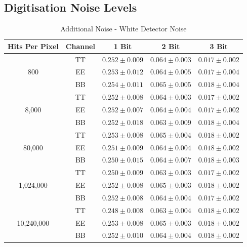 \documentclass[apj]{emulateapj}
\begin{document}
\subsection{Digitisation Noise Levels}
\label{subsec:appendixnoisetables}

\def\arraystretch{1.3}
\begin{table}[tbh]
\begin{center}
\caption{\label{tab:extranoisewhite} Additional Noise - White Detector Noise}
\small
\begin{tabular}{c c c c c}
Hits Per Pixel & Channel & 1 Bit & 2 Bit & 3 Bit \\
\hline
\hline
\multirow{3}{*}{800}  & TT  & $ 0.252 \pm 0.009 $  & $ 0.064 \pm 0.003 $  & $ 0.017 \pm 0.002 $ \\
& EE  & $ 0.253 \pm 0.012 $  & $ 0.064 \pm 0.005 $  & $ 0.017 \pm 0.004 $ \\
& BB  & $ 0.254 \pm 0.011 $  & $ 0.065 \pm 0.005 $  & $ 0.018 \pm 0.004 $ \\
\hline
\multirow{3}{*}{8,000}  & TT  & $ 0.252 \pm 0.008 $  & $ 0.064 \pm 0.003 $  & $ 0.017 \pm 0.002 $ \\
& EE  & $ 0.252 \pm 0.007 $  & $ 0.064 \pm 0.004 $  & $ 0.017 \pm 0.002 $ \\
& BB  & $ 0.252 \pm 0.018 $  & $ 0.063 \pm 0.009 $  & $ 0.018 \pm 0.004 $ \\
\hline
\multirow{3}{*}{80,000}  & TT  & $ 0.253 \pm 0.008 $  & $ 0.065 \pm 0.004 $  & $ 0.018 \pm 0.002 $ \\
& EE  & $ 0.251 \pm 0.009 $  & $ 0.064 \pm 0.004 $  & $ 0.018 \pm 0.002 $ \\
& BB  & $ 0.250 \pm 0.015 $  & $ 0.064 \pm 0.007 $  & $ 0.018 \pm 0.003 $ \\
\hline
\multirow{3}{*}{1,024,000}  & TT  & $ 0.250 \pm 0.009 $  & $ 0.063 \pm 0.003 $  & $ 0.017 \pm 0.002 $ \\
& EE  & $ 0.252 \pm 0.008 $  & $ 0.065 \pm 0.003 $  & $ 0.018 \pm 0.002 $ \\
& BB  & $ 0.252 \pm 0.008 $  & $ 0.064 \pm 0.004 $  & $ 0.017 \pm 0.002 $ \\
\hline
\multirow{3}{*}{10,240,000}  & TT  & $ 0.248 \pm 0.008 $  & $ 0.063 \pm 0.004 $  & $ 0.018 \pm 0.002 $ \\
& EE  & $ 0.253 \pm 0.008 $  & $ 0.065 \pm 0.003 $  & $ 0.018 \pm 0.002 $ \\
& BB  & $ 0.252 \pm 0.010 $  & $ 0.064 \pm 0.004 $  & $ 0.018 \pm 0.002 $ \\
\hline

\end{tabular}
\end{center}
\end{table}
\end{document}

